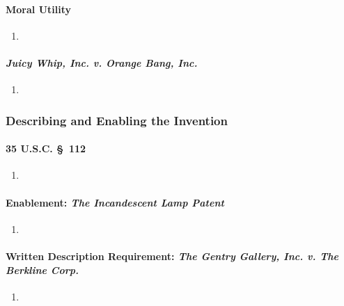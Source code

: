 \paragraph{Moral Utility} %

\begin{enumerate}
    \item 
\end{enumerate}

\paragraph{\emph{Juicy Whip, Inc. v. Orange Bang, Inc.}} %

\begin{enumerate}
    \item 
\end{enumerate}

\subsubsection{Describing and Enabling the Invention}

\paragraph{35 U.S.C. \S\ 112} %

\begin{enumerate}
    \item 
\end{enumerate}

\paragraph{Enablement: \emph{The Incandescent Lamp Patent}} %

\begin{enumerate}
    \item 
\end{enumerate}

\paragraph{Written Description Requirement: \emph{The Gentry Gallery, Inc. v. 
The Berkline Corp.}} %

\begin{enumerate}
    \item 
\end{enumerate}

